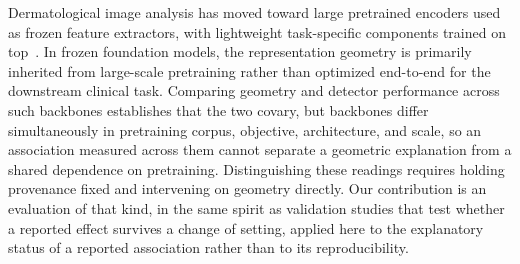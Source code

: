 Dermatological image analysis has moved toward large pretrained encoders used
as frozen feature extractors, with lightweight task-specific components
trained on top~\cite{yan2025panderm}. In frozen foundation models, the
representation geometry is primarily inherited from large-scale pretraining
rather than optimized end-to-end for the downstream clinical task. Comparing
geometry and detector performance across such backbones establishes that the
two covary, but backbones differ simultaneously in pretraining corpus,
objective, architecture, and scale, so an association measured across them
cannot separate a geometric explanation from a shared dependence on
pretraining. Distinguishing these readings requires holding provenance fixed
and intervening on geometry directly. Our contribution is an evaluation of
that kind, in the same spirit as validation studies that test whether a
reported effect survives a change of setting, applied here to the
explanatory status of a reported association rather than to its
reproducibility.
